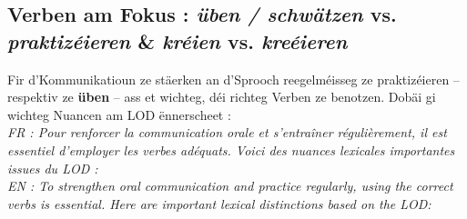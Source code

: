 \subsection{Verben am Fokus : \textit{üben / schwätzen} vs. \textit{praktizéieren} \& \textit{kréien} vs. \textit{kreéieren}}

Fir d'Kommunikatioun ze stäerken an d'Sprooch reegelméisseg ze praktizéieren -- respektiv ze \textbf{üben} -- ass et wichteg, déi richteg Verben ze benotzen. Dobäi gi wichteg Nuancen am LOD ënnerscheet : \\
\textit{FR : Pour renforcer la communication orale et s'entraîner régulièrement, il est essentiel d'employer les verbes adéquats. Voici des nuances lexicales importantes issues du LOD :} \\
\textit{EN : To strengthen oral communication and practice regularly, using the correct verbs is essential. Here are important lexical distinctions based on the LOD:}

